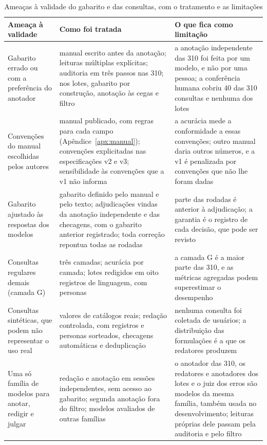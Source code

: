 \begin{table}[htbp!]
\centering
\caption[Ameaças à validade do gabarito e das consultas]{Ameaças à validade do gabarito e das consultas, com o tratamento e as limitações}
\label{tab:ameacas-validade}
\footnotesize
\begin{tabular}{|p{3.4cm}|p{5.9cm}|p{5.4cm}|}
\hline
\textbf{Ameaça à validade} & \textbf{Como foi tratada} & \textbf{O que fica como limitação} \\
\hline
Gabarito errado ou com a preferência do anotador & manual escrito antes da anotação; leituras múltiplas explícitas; auditoria em três passos nas 310; nos lotes, gabarito por construção, anotação às cegas e filtro & a anotação independente das 310 foi feita por um modelo, e não por uma pessoa; a conferência humana cobriu 40 das 310 consultas e nenhuma dos lotes \\ \hline
Convenções do manual escolhidas pelos autores & manual publicado, com regras para cada campo (Apêndice~\ref{apx:manual}); convenções explicitadas nas especificações v2 e v3; sensibilidade às convenções que a v1 não informa & a acurácia mede a conformidade a essas convenções; outro manual daria outros números, e a v1 é penalizada por convenções que não lhe foram dadas \\ \hline
Gabarito ajustado às respostas dos modelos & gabarito definido pelo manual e pelo texto; adjudicações vindas da anotação independente e das checagens, com o gabarito anterior registrado; toda correção repontua todas as rodadas & parte das rodadas é anterior à adjudicação; a garantia é o registro de cada decisão, que pode ser revisto \\ \hline
Consultas regulares demais (camada G) & três camadas; acurácia por camada; lotes redigidos em oito registros de linguagem, com personas & a camada G é a maior parte das 310, e as métricas agregadas podem superestimar o desempenho \\ \hline
Consultas sintéticas, que podem não representar o uso real & valores de catálogos reais; redação controlada, com registros e personas sorteados, checagens automáticas e deduplicação & nenhuma consulta foi coletada de usuários; a distribuição das formulações é a que os redatores produzem \\ \hline
Uma só família de modelos para anotar, redigir e julgar & redação e anotação em sessões independentes, sem acesso ao gabarito; segunda anotação fora do filtro; modelos avaliados de outras famílias & o anotador das 310, os redatores e anotadores dos lotes e o juiz dos erros são modelos da mesma família, também usada no desenvolvimento; leituras próprias dele passam pela auditoria e pelo filtro \\ \hline

\end{tabular}
\end{table}
